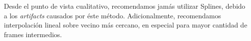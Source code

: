 \par Desde el punto de vista cualitativo, recomendamos jam\'as utilizar Splines, debido a los \textit{artifacts} causados por \'este m\'etodo.
Adicionalmente, recomendamos interpolaci\'on lineal sobre vecino m\'as cercano, en especial para mayor cantidad de frames intermedios.
